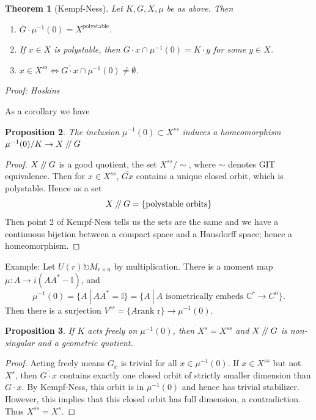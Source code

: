 \documentclass{article}
\newtheorem{theorem}{Theorem}
\newtheorem{prop}[theorem]{Proposition}
\theoremstyle{definition}
\theoremstyle{remark}
\numberwithin{theorem}{section}
\newcommand{\C}{\mathbb{C}}
\newcommand{\sslash}{\mathbin{/\mkern-4mu/}}
\newenvironment{thm}{
\begin{mdframed}
	\vspace{-0.5em}
	\begin{theorem}
}{
	\end{theorem}
\end{mdframed}
}
\begin{document}
			\begin{thm}[Kempf-Ness]
				Let $K,G,X,\mu$ be as above. Then
			\begin{enumerate}
				\item $G \cdot \mu^{-1}(0) = X^{\text{polystable}}$.
				\item If $x\in X$ is polystable, then $G\cdot x \cap \mu^{-1}(0)=K\cdot y$ for some $y\in X$.
				\item $x\in X^{ss} \iff \overline{G\cdot x}\cap \mu^{-1}(0)\neq \emptyset$.
			\end{enumerate}
			Proof: Hoskins
			\end{thm}

			As a corollary we have
			\begin{prop}
				The inclusion $\mu^{-1}(0)\subset X^{ss}$ induces a homeomorphism $\mu^{-1}(0)/K \to X\sslash G$
			\end{prop}
			\begin{proof}
				$X\sslash G$ is a good quotient, the set $X^{ss} /\sim$, where $\sim$ denotes GIT equivalence. Then for $x\in X^{ss}$, $\overline{G\dot x}$ contains a unique closed orbit, which is polystable. Hence as a set
			$$ X\sslash G = \{ \text{polystable orbits}\}$$
			Then point 2 of Kempf-Ness tells us the sets are the same and we have a continuous bijetion between a compact space and a Hausdorff space; hence a homeomorphism.
			\end{proof}

			Example: Let $U(r)\circlearrowright M_{r\times n}$ by multiplication. There is a moment map $\mu:A\to i(AA^\ast - \mathbb{I})$, and
			\begin{equation}
				\mu^{-1}(0)= \{A ~|~ AA^\ast  = \mathbb{I}\} = \{A ~|~  A \text{ isometrically embeds } \C^r\to C^n \}.
			\end{equation}
			Then there is a surjection $V^{ss} = \{A \text{rank r}\}\to \mu^{-1}(0)$.
			
			\begin{prop}
				If $K$ acts freely on $\mu^{-1}(0)$, then $X^s = X^{ss}$ and $X\sslash G$ is non-singular and a geometric quotient.
			\end{prop}
			\begin{proof}
				Acting freely means $G_x$ is trivial for all $x\in \mu^{-1}(0)$. If $x\in X^{ss}$ but not $X^s$, then $\overline{G\cdot x}$ contains exactly one closed orbit of strictly smaller dimension than $G\cdot x$. By Kempf-Ness, this orbit is in $\mu^{-1}(0)$ and hence has trivial stabilizer. However, this implies that this closed orbit has full dimension, a contradiction. Thus $X^{ss}=X^s$.
			\end{proof}
			
\end{document}
